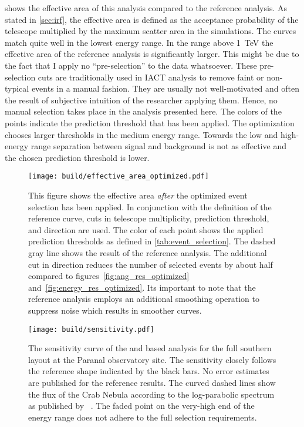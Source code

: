  shows the effective area of this analysis compared to the reference analysis. As stated in \cref{sec:irf}, the effective 
area is defined as the acceptance probability of the telescope multiplied by the maximum scatter area in the simulations. 
The curves match quite well in the lowest energy range. In the range above \SI{1}{TeV} the effective area of the reference analysis is significantly larger.
This might be due to the fact that I apply no \enquote{pre-selection} to the data whatsoever. These pre-selection cuts 
are traditionally used in IACT analysis to remove faint or non-typical events in a manual fashion. They are usually not well-motivated 
and often the result of subjective intuition of the researcher applying them. Hence, no manual selection takes place in the analysis presented here. 
The colors of the points indicate the prediction threshold that has been applied. The optimization chooses larger thresholds in the medium energy range. 
Towards the low and high-energy range separation between signal and background is not as effective and the chosen prediction threshold is lower.
\begin{figure}
    \centering
    \texttt{[image: build/effective\_area\_optimized.pdf]}
    \caption[Effective area of CTA analysis]{
    This figure shows the effective area \emph{after} the optimized event selection has been applied.
    In conjunction with the definition of the reference curve, cuts in telescope multiplicity, prediction threshold, and direction are used. 
    The color of each point shows the applied prediction thresholds as defined in \cref{tab:event_selection}. 
    The dashed gray line shows the result of the reference analysis. 
    The additional cut in direction reduces the number of selected events by about half compared to figures~\ref{fig:ang_res_optimized} and~\ref{fig:energy_res_optimized}.
    Its important to note that the reference analysis employs an additional smoothing operation to suppress noise which results in smoother curves.
    }
    \label{fig:eff_area_optimized}
    \vspace*{\floatsep}%
    \texttt{[image: build/sensitivity.pdf]}
    \caption[Sensitivity curve of the CTA analysis]{The sensitivity curve of the \ctapipe and \aicttools based analysis for the full southern layout at the Paranal observatory site.
    The sensitivity closely follows the reference shape indicated by the black bars. No error estimates are published for the reference results.
    The curved dashed lines show the flux of the Crab Nebula according to the log-parabolic spectrum as published by \magic~\cite{magic-crab-data}.
    The faded point on the very-high end of the energy range does not adhere to the full selection requirements. 
    }
    \label{fig:sensitivity}

\end{figure}



